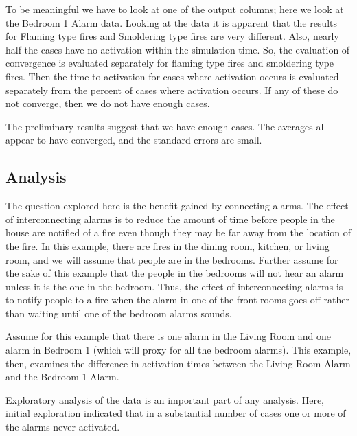\documentclass[12pt,twoside]{book}
\begin{document}
To be meaningful we have to look at one of the output columns; here we look at the Bedroom 1 Alarm data. Looking at the data it is apparent that the results for Flaming type fires and Smoldering type fires are very different. Also, nearly half the cases have no activation within the simulation time. So, the evaluation of convergence is evaluated separately for flaming type fires and smoldering type fires. Then the time to activation for cases where activation occurs is evaluated separately from the percent of cases where activation occurs. If any of these do not converge, then we do not have enough cases.

The preliminary results suggest that we have enough cases. The averages all appear to have converged, and the standard errors are small.

\hypertarget{analysis}{%
\subsection{Analysis}\label{analysis}}

The question explored here is the benefit gained by connecting alarms. The effect of interconnecting alarms is to reduce the amount of time before people in the house are notified of a fire even though they may be far away from the location of the fire. In this example, there are fires in the dining room, kitchen, or living room, and we will assume that people are in the bedrooms. Further assume for the sake of this example that the people in the bedrooms will not hear an alarm unless it is the one in the bedroom. Thus, the effect of interconnecting alarms is to notify people to a fire when the alarm in one of the front rooms goes off rather than waiting until one of the bedroom alarms sounds.

Assume for this example that there is one alarm in the Living Room and one alarm in Bedroom 1 (which will proxy for all the bedroom alarms). This example, then, examines the difference in activation times between the Living Room Alarm and the Bedroom 1 Alarm.

Exploratory analysis of the data is an important part of any analysis. Here, initial exploration indicated that in a substantial number of cases one or more of the alarms never activated.
\end{document}
